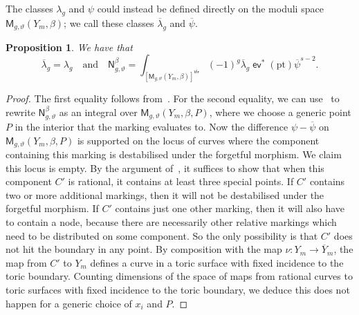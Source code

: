 \documentclass[11pt]{amsart}
\numberwithin{equation}{section}
\theoremstyle{plain}
\newtheorem{proposition}[theorem]{Proposition}
\theoremstyle{remark}
\theoremstyle{definition}
\DeclareMathOperator{\ev}{\mathsf{ev}}
\begin{document}
The classes $\lambda_g$ and $\psi$ could instead be defined directly on the moduli space $\mathsf{M}_{g,\vartheta}(Y_m,\beta)$; we call these classes $\overline{\lambda}_g$ and $\overline{\psi}$.

\begin{proposition} We have that 
    $$\overline{\lambda}_g = \lambda_g \quad \text{and}\quad  \mathsf{N}_{g,\vartheta}^{\beta} = \int_{\left[\mathsf{M}_{g,\vartheta}(Y_m,\beta)\right]^\mathsf{vir}}(-1)^g\overline{\lambda}_g \ev^* (\mathrm{pt}) \overline{\psi}^{s-2}.$$
\end{proposition}

\begin{proof}
    The first equality follows from~\cite[Remark 2.1]{kennedyhunt2023tropical}. For the second equality, we can use~\cite[Example 6.3.4(a)]{Fulton} to rewrite $\mathsf{N}_{g,\vartheta}^{\beta}$ as an integral over $\mathsf{M}_{g,\vartheta}(Y_m,\beta,P)$, where we choose a generic point $P$ in the interior that the marking evaluates to. Now the difference $\psi - \overline{\psi}$ on $\mathsf{M}_{g,\vartheta}(Y_m,\beta,P)$ is supported on the locus of curves where the component containing this marking is destabilised under the forgetful morphism. We claim this locus is empty. By the argument of~\cite[Proposition 3.4]{MandelRuddat}, it suffices to show that when this component $C'$ is rational, it contains at least three special points. If $C'$ contains two or more additional markings, then it will not be destabilised under the forgetful morphism. 
    If $C'$ contains just one other marking, then it will also have to contain a node, because there are necessarily other relative markings which need to be distributed on some component. 
    So the only possibility is that $C'$ does not hit the boundary in any point. By composition with the map $\nu\colon Y_m \rightarrow \overline{Y}_m$, the map from $C'$ to $Y_m$ defines a curve in a toric surface with fixed incidence to the toric boundary. Counting dimensions of the space of maps from rational curves to toric surfaces with fixed incidence to the toric boundary, we deduce this does not happen for a generic choice of $x_i$ and $P$.
\end{proof}
\end{document}
